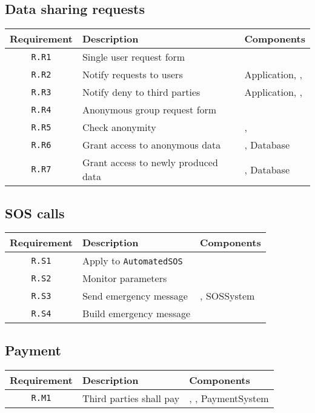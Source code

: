 \documentclass[../DD0.tex]{subfiles}
\newcommand{\tracMatrix}[3] {
  \begin{table}[h!]
    \centering
    \begin{tabularx}{\linewidth}{|c|X|X|}
      \hline
      \textbf{Requirement} & \textbf{Description} & \textbf{Components} \\
      #3
      \hline
    \end{tabularx}
    \label{tab:#2}
  \end{table}
}
\newcommand{\tracRow}[3] {
  \hline \texttt{R.#1} & #2 & #3 \\
}
\begin{document}
  \subsection{Data sharing requests}

    \tracMatrix{}{datasharingrequests}{
      \tracRow{R1}{Single user request form}{\RequestManager}
      \tracRow{R2}{Notify requests to users}{Application, \AccountManager, \RequestManager}
      \tracRow{R3}{Notify deny to third parties}{Application, \AccountManager, \RequestManager}
      \tracRow{R4}{Anonymous group request form}{\RequestManager}
      \tracRow{R5}{Check anonymity}{\RequestManager, \SetBuilder}
      \tracRow{R6}{Grant access to anonymous data}{\RequestManager, Database}
      \tracRow{R7}{Grant access to newly produced data}{\RequestManager, Database}
    }

  \subsection{SOS calls}

    \tracMatrix{}{tracsoscalls}{
      \tracRow{S1}{Apply to \texttt{AutomatedSOS}}{\AccountManager}
      \tracRow{S2}{Monitor parameters}{\EmergencyDetector}
      \tracRow{S3}{Send emergency message}{\EmergencyDispatcher, SOSSystem}
      \tracRow{S4}{Build emergency message}{\EmergencyDispatcher}
    }

  \clearpage
  \subsection{Payment}

    \tracMatrix{}{tracpayment}{
      \tracRow{M1}{Third parties shall pay}{\AccountManager, \PaymentGateway, PaymentSystem}
    }
\end{document}
